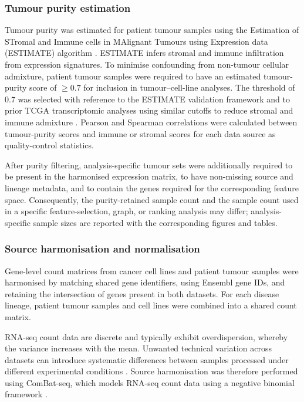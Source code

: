 \subsubsection{Tumour purity estimation}

Tumour purity was estimated for patient tumour samples using the Estimation of STromal and Immune cells in MAlignant Tumours using Expression data (ESTIMATE) algorithm \citep{Yoshihara2013}. ESTIMATE infers stromal and immune infiltration from expression signatures. To minimise confounding from non-tumour cellular admixture, patient tumour samples were required to have an estimated tumour-purity score of $\geq 0.7$ for inclusion in tumour--cell-line analyses. The threshold of 0.7 was selected with reference to the ESTIMATE validation framework and to prior TCGA transcriptomic analyses using similar cutoffs to reduce stromal and immune admixture \citep{Jin2023}. Pearson and Spearman correlations were calculated between tumour-purity scores and immune or stromal scores for each data source as quality-control statistics.

After purity filtering, analysis-specific tumour sets were additionally required to be present in the harmonised expression matrix, to have non-missing source and lineage metadata, and to contain the genes required for the corresponding feature space. Consequently, the purity-retained sample count and the sample count used in a specific feature-selection, graph, or ranking analysis may differ; analysis-specific sample sizes are reported with the corresponding figures and tables.

\subsubsection{Source harmonisation and normalisation}

Gene-level count matrices from cancer cell lines and patient tumour samples
were harmonised by matching shared gene identifiers, using Ensembl gene IDs,
and retaining the intersection of genes present in both datasets. For each
disease lineage, patient tumour samples and cell lines were combined into a
shared count matrix.

RNA-seq count data are discrete and typically exhibit overdispersion, whereby
the variance increases with the mean. Unwanted technical variation across
datasets can introduce systematic differences between samples processed under
different experimental conditions \citep{Leek2010BatchEffects,Leek2012}. Source
harmonisation was therefore performed using ComBat-seq, which models RNA-seq
count data using a negative binomial framework \citep{Zhang2020ComBatSeq}.

